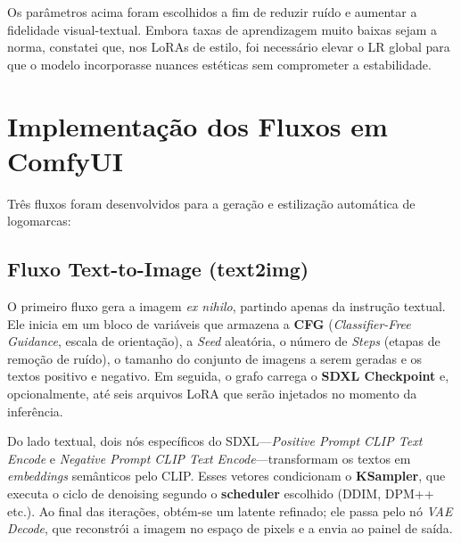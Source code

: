 \documentclass[12pt, %
openright, 
oneside, %
a4paper,    %
brazil]{facom-ufu-abntex2}
\begin{document}
Os parâmetros acima foram escolhidos a fim de reduzir ruído e aumentar a fidelidade visual-textual. Embora taxas de aprendizagem muito baixas sejam a norma, constatei que, nos LoRAs de estilo, foi necessário elevar o LR global para que o modelo incorporasse nuances estéticas sem comprometer a estabilidade.

\section{Implementação dos Fluxos em ComfyUI}

Três fluxos foram desenvolvidos para a geração e estilização automática de logomarcas:

\subsection{Fluxo Text-to-Image (text2img)}

O primeiro fluxo gera a imagem \emph{ex nihilo}, partindo apenas da instrução textual. Ele inicia em um bloco de variáveis que armazena a \textbf{CFG} (\emph{Classifier-Free Guidance}, escala de orientação), a \emph{Seed} aleatória, o número de \emph{Steps} (etapas de remoção de ruído), o tamanho do conjunto de imagens a serem geradas e os textos positivo e negativo. Em seguida, o grafo carrega o \textbf{SDXL Checkpoint} e, opcionalmente, até seis arquivos LoRA que serão injetados no momento da inferência.

Do lado textual, dois nós específicos do SDXL—\textit{Positive Prompt CLIP Text Encode} e \textit{Negative Prompt CLIP Text Encode}—transformam os textos em \emph{embeddings} semânticos pelo CLIP. Esses vetores condicionam o \textbf{KSampler}, que executa o ciclo de denoising segundo o \textbf{scheduler} escolhido (DDIM, DPM++ etc.). Ao final das iterações, obtém-se um latente refinado; ele passa pelo nó \textit{VAE Decode}, que reconstrói a imagem no espaço de pixels e a envia ao painel de saída.
\end{document}

